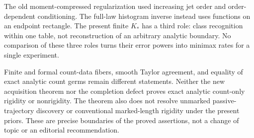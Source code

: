 The old moment-compressed regularization used increasing jet order and
order-dependent conditioning. The full-law histogram inverse instead
uses functions on an endpoint rectangle. The present finite $K_*$ has a
third role: class recognition within one table, not reconstruction of an
arbitrary analytic boundary. No comparison of these three roles turns
their error powers into minimax rates for a single experiment.

Finite and formal count-data fibers, smooth Taylor agreement, and equality
of exact analytic count germs remain different statements. Neither the
new acquisition theorem nor the completion defect proves exact analytic
count-only rigidity or nonrigidity. The theorem also does not resolve
unmarked passive-trajectory discovery or conventional marked-length
rigidity under the present priors. These are precise boundaries of the
proved assertions, not a change of topic or an editorial recommendation.
